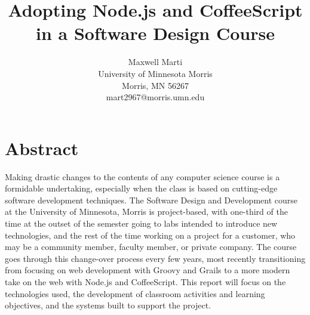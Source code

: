 \documentclass[12pt]{article}
\newcommand{\comment}[1]{{\bf \tt  {#1}}}
\begin{document}
\pagestyle{plain}
%




\title{Adopting Node.js and CoffeeScript in a Software Design Course}
%
%




\author{
Maxwell Marti \\
University of Minnesota Morris\\
Morris, MN 56267\\
mart2967@morris.umn.edu
}




\date{}




\maketitle
\thispagestyle{empty}


\section*{\centering Abstract}
Making drastic changes to the contents of any computer science course is a formidable undertaking, especially when the class is based on cutting-edge software development techniques. The Software Design and Development course at the University of Minnesota, Morris is project-based, with one-third of the time at the outset of the semester going to labs intended to introduce new technologies, and the rest of the time working on a project for a customer, who may be a community member, faculty member, or private company. The course goes through this change-over process every few years, most recently transitioning from focusing on web development with Groovy and Grails to a more modern take on the web with Node.js and CoffeeScript. This report will focus on the technologies used, the development of classroom activities and learning objectives, and the systems built to support the project.
	
\end{document}
